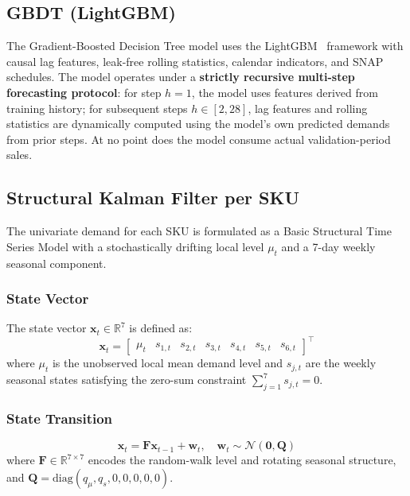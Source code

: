 \documentclass[conference]{IEEEtran}
\begin{document}
\subsection{GBDT (LightGBM)}

The Gradient-Boosted Decision Tree model uses the LightGBM~\cite{ke2017lightgbm} framework with causal lag features, leak-free rolling statistics, calendar indicators, and SNAP schedules. The model operates under a \textbf{strictly recursive multi-step forecasting protocol}: for step $h = 1$, the model uses features derived from training history; for subsequent steps $h \in [2, 28]$, lag features and rolling statistics are dynamically computed using the model's own predicted demands from prior steps. At no point does the model consume actual validation-period sales.

\subsection{Structural Kalman Filter per SKU}

The univariate demand for each SKU is formulated as a Basic Structural Time Series Model with a stochastically drifting local level $\mu_t$ and a 7-day weekly seasonal component.

\subsubsection{State Vector}
The state vector $\mathbf{x}_t \in \mathbb{R}^7$ is defined as:
\begin{equation}
    \mathbf{x}_t = \begin{bmatrix} \mu_t & s_{1,t} & s_{2,t} & s_{3,t} & s_{4,t} & s_{5,t} & s_{6,t} \end{bmatrix}^\top
\end{equation}
where $\mu_t$ is the unobserved local mean demand level and $s_{j,t}$ are the weekly seasonal states satisfying the zero-sum constraint $\sum_{j=1}^{7} s_{j,t} = 0$.

\subsubsection{State Transition}
\begin{equation}
    \mathbf{x}_t = \mathbf{F} \mathbf{x}_{t-1} + \mathbf{w}_t, \quad \mathbf{w}_t \sim \mathcal{N}(\mathbf{0}, \mathbf{Q})
\end{equation}
where $\mathbf{F} \in \mathbb{R}^{7 \times 7}$ encodes the random-walk level and rotating seasonal structure, and $\mathbf{Q} = \text{diag}(q_\mu, q_s, 0, 0, 0, 0, 0)$.
\end{document}
